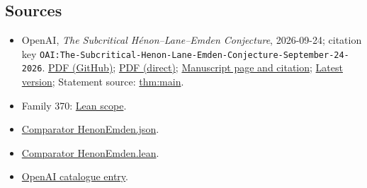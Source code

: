 \documentclass[11pt]{article}
\begin{document}
\subsection{Sources}
\begin{itemize}
\item OpenAI, \emph{The Subcritical Hénon–Lane–Emden Conjecture}, 2026-09-24; citation key \texttt{OAI:The-Subcritical-Henon-Lane-Emden-Conjecture-September-24-2026}. \href{https://github.com/openai/math/blob/adc7f1241b42e322a6451854ab7e4b4c146bf78a/preprints/The-Subcritical-Henon-Lane-Emden-Conjecture-September-24-2026/paper.pdf}{PDF (GitHub)}; \href{https://github.com/openai/math/raw/adc7f1241b42e322a6451854ab7e4b4c146bf78a/preprints/The-Subcritical-Henon-Lane-Emden-Conjecture-September-24-2026/paper.pdf}{PDF (direct)}; \href{https://github.com/openai/math/blob/adc7f1241b42e322a6451854ab7e4b4c146bf78a/preprints/The-Subcritical-Henon-Lane-Emden-Conjecture-September-24-2026/README.md}{Manuscript page and citation}; \href{https://github.com/openai/math/blob/main/preprints/The-Subcritical-Henon-Lane-Emden-Conjecture-September-24-2026/paper.pdf}{Latest version}; Statement source: \href{https://github.com/openai/math/blob/adc7f1241b42e322a6451854ab7e4b4c146bf78a/preprints/The-Subcritical-Henon-Lane-Emden-Conjecture-September-24-2026/build/sections/01-introduction.tex\#L44}{thm:main}.
\item Family 370: \href{https://github.com/openai/math/blob/adc7f1241b42e322a6451854ab7e4b4c146bf78a/lean/docs/370.md}{Lean scope}.
\item \href{https://github.com/openai/math/blob/adc7f1241b42e322a6451854ab7e4b4c146bf78a/lean/ComparatorChallenges/HenonEmden.json}{Comparator HenonEmden.json}.
\item \href{https://github.com/openai/math/blob/adc7f1241b42e322a6451854ab7e4b4c146bf78a/lean/ComparatorChallenges/HenonEmden.lean}{Comparator HenonEmden.lean}.
\item \href{https://github.com/openai/math/blob/adc7f1241b42e322a6451854ab7e4b4c146bf78a/CONTENTS.md}{OpenAI catalogue entry}.
\end{itemize}
\end{document}
